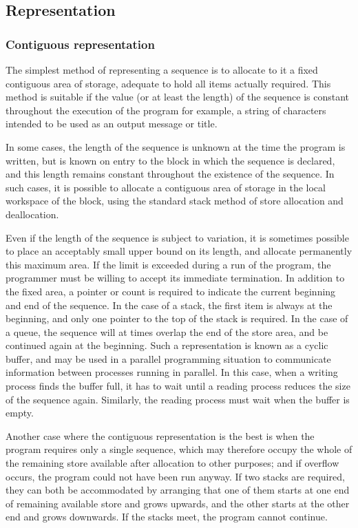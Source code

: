 \subsection{Representation}

\subsubsection{Contiguous representation}

The simplest method of representing a sequence is to allocate to it a fixed contiguous area of storage, adequate to hold all items actually required. This method is suitable if the value (or at least the length) of the sequence is constant throughout the execution of the program \textemdash{} for example, a string of characters intended to be used as an output message or title.

In some cases, the length of the sequence is unknown at the time the program is written, but is known on entry to the block in which the sequence is declared, and this length remains constant throughout the existence of the sequence. In such cases, it is possible to allocate a contiguous area of storage in the local workspace of the block, using the standard stack method of store allocation and deallocation.

Even if the length of the sequence is subject to variation, it is sometimes possible to place an acceptably small upper bound on its length, and allocate permanently this maximum area. If the limit is exceeded during a run of the program, the programmer must be willing to accept its immediate termination. In addition to the fixed area, a pointer or count is required to indicate the current beginning and end of the sequence. In the case of a stack, the first item is always at the beginning, and only one pointer to the top of the stack is required. In the case of a queue, the sequence will at times overlap the end of the store area, and be continued again at the beginning. Such a representation is known as a cyclic buffer, and may be used in a parallel programming situation to communicate information between processes running in parallel. In this case, when a writing process finds the buffer full, it has to wait until a reading process reduces the size of the sequence again. Similarly, the reading process must wait when the buffer is empty.

Another case where the contiguous representation is the best is when the program requires only a single sequence, which may therefore occupy the whole of the remaining store available after allocation to other purposes; and if overflow occurs, the program could not have been run anyway. If two stacks are required, they can both be accommodated by arranging that one of them starts at one end of remaining available store and grows upwards, and the other starts at the other end and grows downwards. If the stacks meet, the program cannot continue.

